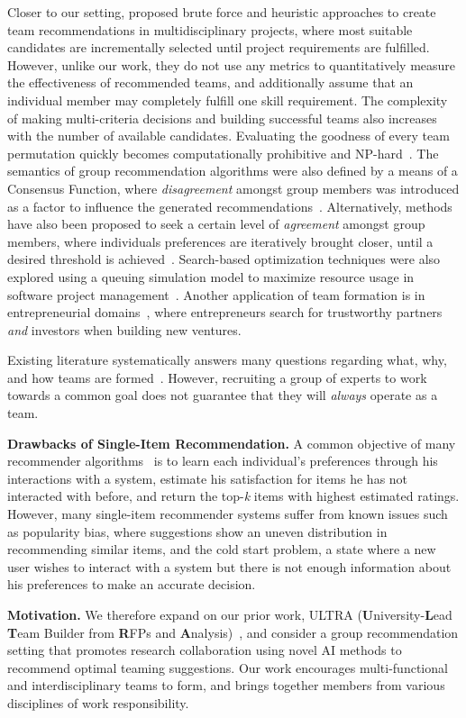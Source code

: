 Closer to our setting, \cite{machado2019fair} proposed brute force and heuristic approaches to create team recommendations in multidisciplinary projects, where most suitable candidates are incrementally selected until project requirements are fulfilled. However, unlike our work, they do not use any metrics to quantitatively measure the effectiveness of recommended teams, and additionally assume that an individual member may completely fulfill one skill requirement. The complexity of making multi-criteria decisions and building successful teams also increases with the number of available candidates. Evaluating the goodness of every team permutation quickly becomes computationally prohibitive and NP-hard~\cite{roy2014exploiting}. The semantics of group recommendation algorithms were also defined by a means of a Consensus Function, where \textit{disagreement} amongst group members was introduced as a factor to influence the generated recommendations~\cite{ameryahia2009group}. Alternatively, methods have also been proposed to seek a certain level of \textit{agreement} amongst group members, where individuals preferences are iteratively brought closer, until a desired threshold is achieved~\cite{castro2015consensus}. Search-based optimization techniques were also explored using a queuing simulation model to maximize resource usage in software project management~\cite{di2011use}. Another application of team formation is in entrepreneurial domains~\cite{lazar2020entrepreneurial}, where entrepreneurs search for trustworthy partners \textit{and} investors when building new ventures. 

Existing literature systematically answers many questions regarding what, why, and how teams are formed~\cite{costa2020team, juarez2021comprehensive}.
However, recruiting a group of experts to work towards a common goal does not guarantee that they will \textit{always} operate as a team. %

\textbf{Drawbacks of Single-Item Recommendation.} A common objective of many recommender algorithms~\cite{su2009survey, cremonesi2010performance} is to learn each individual's preferences through his interactions with a system, estimate his satisfaction for items he has not interacted with before, and return the top-\textit{k} items with highest estimated ratings. However, many single-item recommender systems suffer from known issues such as popularity bias, %
where suggestions show an uneven distribution in recommending similar items, and the cold start problem, %
a state where a new user wishes to interact with a system but there is not enough information about his preferences to make an accurate decision.

\textbf{Motivation.} We therefore expand on our prior work, ULTRA (\textbf{U}niversity-\textbf{L}ead \textbf{T}eam Builder from \textbf{R}FPs and \textbf{A}nalysis)~\cite{srivastava2022ultra}, and consider a group recommendation setting that promotes research collaboration using novel AI methods to recommend optimal teaming suggestions. Our work encourages multi-functional and interdisciplinary teams to form, and brings together members from various disciplines of work responsibility. 